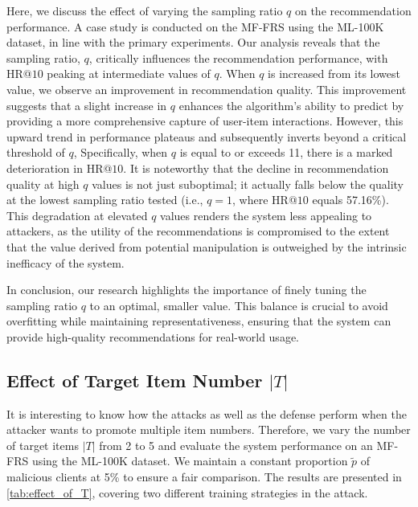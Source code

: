 Here, we discuss the effect of varying the sampling ratio $q$ on the recommendation performance.
A case study is conducted on the MF-FRS using the ML-100K dataset, in line with the primary experiments.
Our analysis reveals that the sampling ratio, $q$, critically influences the recommendation performance, with HR@$10$ peaking at intermediate values of $q$. 
When $q$ is increased from its lowest value, we observe an improvement in recommendation quality. This improvement suggests that a slight increase in $q$ enhances the algorithm's ability to predict by providing a more comprehensive capture of user-item interactions.
However, this upward trend in performance plateaus and subsequently inverts beyond a critical threshold of $q$, Specifically, when $q$ is equal to or exceeds 11, there is a marked deterioration in HR@$10$.
It is noteworthy that the decline in recommendation quality at high $q$ values is not just suboptimal; it actually falls below the quality at the lowest sampling ratio tested (i.e., $q=1$, where HR@$10$ equals 57.16\%). 
This degradation at elevated $q$ values renders the system less appealing to attackers, as the utility of the recommendations is compromised to the extent that the value derived from potential manipulation is outweighed by the intrinsic inefficacy of the system.

In conclusion, our research highlights the importance of finely tuning the sampling ratio $q$ to an optimal, smaller value. This balance is crucial to avoid overfitting while maintaining representativeness, ensuring that the system can provide high-quality recommendations for real-world usage.


\subsection{Effect of Target Item Number $|T|$}

It is interesting to know how the attacks as well as the defense perform when the attacker wants to promote multiple item numbers.
Therefore, we vary the number of target items $|T|$ from 2 to 5 and evaluate the system performance on an MF-FRS using the ML-100K dataset.
We maintain a constant proportion $\tilde{p}$ of malicious clients at 5\% to ensure a fair comparison.
The results are presented in \cref{tab:effect_of_T}, covering two different training strategies in the attack.

